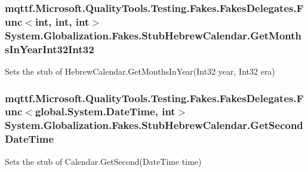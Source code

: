 \hypertarget{class_system_1_1_globalization_1_1_fakes_1_1_stub_hebrew_calendar_aea603037be83e7b0c46d2370988109f9}{
\subsubsection[{Get\-Months\-In\-Year\-Int32\-Int32}]{\setlength{\rightskip}{0pt plus 5cm}mqttf.\-Microsoft.\-Quality\-Tools.\-Testing.\-Fakes.\-Fakes\-Delegates.\-Func$<$int, int, int$>$ System.\-Globalization.\-Fakes.\-Stub\-Hebrew\-Calendar.\-Get\-Months\-In\-Year\-Int32\-Int32}}\label{class_system_1_1_globalization_1_1_fakes_1_1_stub_hebrew_calendar_aea603037be83e7b0c46d2370988109f9}


Sets the stub of Hebrew\-Calendar.\-Get\-Months\-In\-Year(\-Int32 year, Int32 era)

\hypertarget{class_system_1_1_globalization_1_1_fakes_1_1_stub_hebrew_calendar_a6e9b4a684c65a400e6212644b7849147}{
\subsubsection[{Get\-Second\-Date\-Time}]{\setlength{\rightskip}{0pt plus 5cm}mqttf.\-Microsoft.\-Quality\-Tools.\-Testing.\-Fakes.\-Fakes\-Delegates.\-Func$<$global.\-System.\-Date\-Time, int$>$ System.\-Globalization.\-Fakes.\-Stub\-Hebrew\-Calendar.\-Get\-Second\-Date\-Time}}\label{class_system_1_1_globalization_1_1_fakes_1_1_stub_hebrew_calendar_a6e9b4a684c65a400e6212644b7849147}


Sets the stub of Calendar.\-Get\-Second(\-Date\-Time time)

